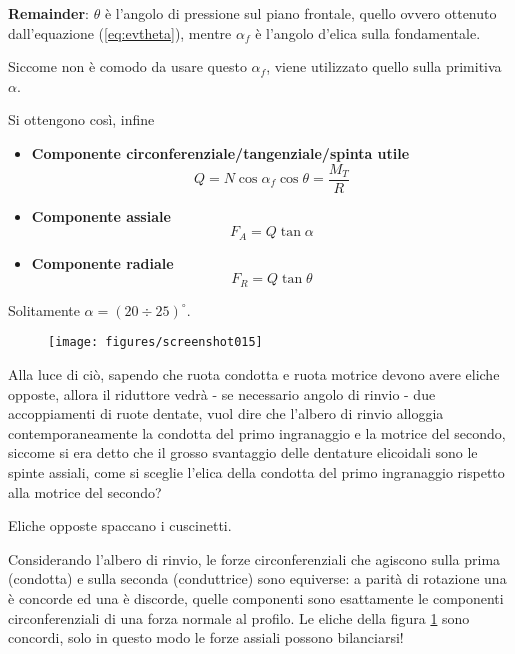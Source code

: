 \documentclass[a4paper, 15pt]{article}
\begin{document}
\begin{adjustwidth}{2in}{}
\begin{itemize}
	\end{itemize}
	
	\textbf{Remainder}: $\theta$ è l'angolo di pressione sul piano frontale, quello ovvero ottenuto dall'equazione (\ref{eq:evtheta}), mentre $\alpha_f$ è l'angolo d'elica sulla fondamentale. 
	
	Siccome non è comodo da usare questo $\alpha_f$, viene utilizzato quello sulla primitiva $\alpha$.
	
	Si ottengono così, infine
	\begin{itemize}
		\item \textbf{Componente circonferenziale/tangenziale/spinta utile}
		\[Q = N\cos\alpha_f\cos\theta=\dfrac{M_T}{R}\]
		\item \textbf{Componente assiale}
		\[F_A = Q\tan\alpha\]
		\item \textbf{Componente radiale}
		\[F_R = Q\tan\theta\]		
	\end{itemize} 
	Solitamente $\alpha=(20\div25)^\circ$. 
\begin{figure}[H]
	\centering
	\label{fig:screenshot015}
	\texttt{[image: figures/screenshot015]}
	\caption{}
\end{figure}
Alla luce di ciò, sapendo che ruota condotta e ruota motrice devono avere eliche opposte, allora il riduttore vedrà - se necessario angolo di rinvio - due accoppiamenti di ruote dentate, vuol dire che l'albero di rinvio alloggia contemporaneamente la condotta del primo ingranaggio e la motrice del secondo, siccome si era detto che il grosso svantaggio delle dentature elicoidali sono le spinte assiali, come si sceglie l'elica della condotta del primo ingranaggio rispetto alla motrice del secondo? 

Eliche opposte spaccano i cuscinetti. \newline

Considerando l'albero di rinvio, le forze circonferenziali che agiscono sulla prima (condotta) e sulla seconda (conduttrice) sono equiverse: a parità di rotazione una è concorde ed una è discorde, quelle componenti sono esattamente le componenti circonferenziali di una forza normale al profilo.
\newpage
Le eliche della figura \ref{fig:screenshot015} sono concordi, solo in questo modo le forze assiali possono bilanciarsi! 
\begin{figure}[H]
	\centering
{}
\end{figure}
\end{adjustwidth}
\end{document}
